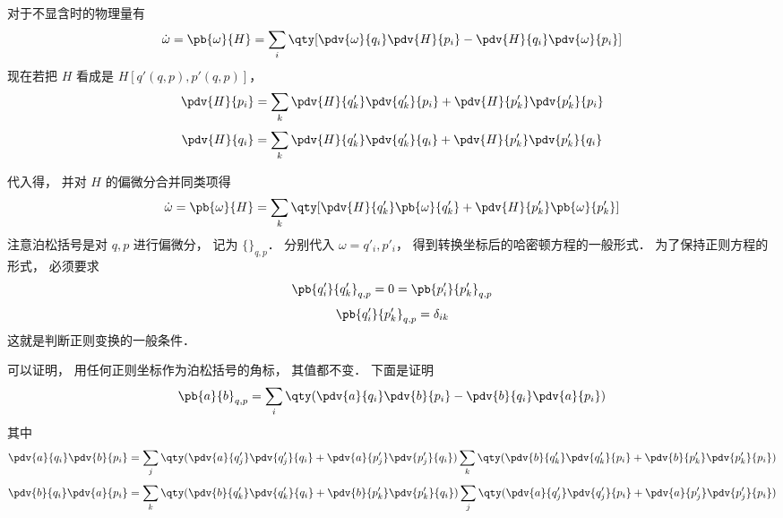 对于不显含时的物理量有
\begin{equation}
\dot \omega  = \pb{\omega}{H}  = \sum_i \qty[\pdv{\omega}{q_i}\pdv{H}{p_i} - \pdv{H}{q_i} \pdv{\omega}{p_i}]
\end{equation}
现在若把 $H$ 看成是 $H[q'(q,p),p'(q,p)]$，  
\begin{equation}
\pdv{H}{p_i} = \sum_k \pdv{H}{q'_k} \pdv{q'_k}{p_i} + \pdv{H}{p'_k} \pdv{p'_k}{p_i}
\end{equation}
\begin{equation}
\pdv{H}{q_i} = \sum_k \pdv{H}{q'_k} \pdv{q'_k}{q_i} + \pdv{H}{p'_k} \pdv{p'_k}{q_i}
\end{equation}
 
代入得， 并对 $H$ 的偏微分合并同类项得
\begin{equation}
\dot \omega  = \pb{\omega}{H} = \sum_k \qty[ \pdv{H}{q'_k} \pb{\omega}{q'_k} + \pdv{H}{p'_k} \pb{\omega}{p'_k}]
\end{equation}
注意泊松括号是对 $q,p$ 进行偏微分， 记为 $\{ {}\}_{q,p}$．  分别代入 $\omega  = q'_i, p'_i$，  得到转换坐标后的哈密顿方程的一般形式． 为了保持正则方程的形式， 必须要求
\begin{equation}
\pb{q'_i}{q'_k}_{q,p} = 0 = \pb{p'_i}{p'_k}_{q,p}
\end{equation}
\begin{equation}
\pb{q'_i}{p'_k}_{q,p} = \delta_{ik}
\end{equation}
这就是判断正则变换的一般条件．

可以证明， 用任何正则坐标作为泊松括号的角标， 其值都不变． 下面是证明
\begin{equation}
\pb{a}{b}_{q,p} = \sum_i \qty( \pdv{a}{q_i}\pdv{b}{p_i} - \pdv{b}{q_i}\pdv{a}{p_i} ) 
\end{equation}
其中
\begin{equation}
\pdv{a}{q_i} \pdv{b}{p_i} = \sum_j \qty( \pdv{a}{q'_j} \pdv{q'_j}{q_i} + \pdv{a}{p'_j}\pdv{p'_j}{q_i} ) \sum_k \qty(\pdv{b}{q'_k}\pdv{q'_k}{p_i} + \pdv{b}{p'_k}\pdv{p'_k}{p_i}) 
\end{equation}
\begin{equation}
\pdv{b}{q_i} \pdv{a}{p_i} = \sum_k \qty( \pdv{b}{q'_k}\pdv{q'_k}{q_i} + \pdv{b}{p'_k}\pdv{p'_k}{q_i} ) \sum_j \qty(\pdv{a}{q'_j}\pdv{q'_j}{p_i} + \pdv{a}{p'_j}\pdv{p'_j}{p_i})
\end{equation}
 
